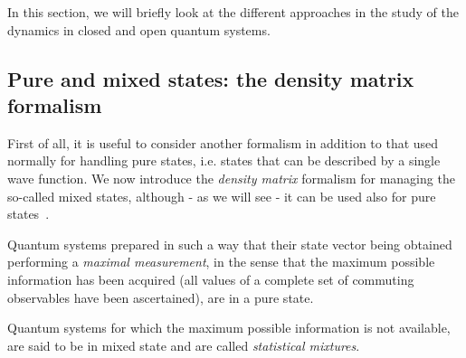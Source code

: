 In this section, we will briefly look at the different approaches in the study of the dynamics in closed and open quantum systems. 

\subsection{Pure and mixed states: the density matrix formalism}
First of all, it is useful to consider another formalism in addition to that used normally for handling pure states, i.e. states that can be described by a single wave function. We now introduce the \emph{density matrix} formalism for managing the so-called mixed states, although - as we will see - it can be used also for pure states~\cite{bransden_qm}.

Quantum systems prepared in such a way that their state vector being obtained performing a \emph{maximal measurement}, in the sense that the maximum possible information has been acquired (all values of a complete set of commuting observables have been ascertained), are in a pure state. 

Quantum systems for which the maximum possible information is not available, are said to be in mixed state and are called \emph{statistical mixtures}.

